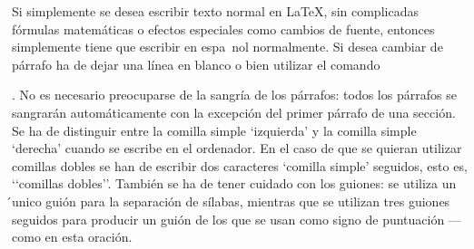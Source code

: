 \documentclass[a4paper,10pt]{letter}
\begin{document}
 Si simplemente se desea escribir texto normal en LaTeX,
 sin complicadas fórmulas matemáticas o efectos especiales
 como cambios de fuente, entonces simplemente tiene que escribir
 en espa~nol normalmente.
 Si desea cambiar de párrafo ha de dejar una línea en blanco o bien
 utilizar el comando \par.
 No es necesario preocuparse de la sangría de los párrafos:
 todos los párrafos se sangrarán automáticamente con la excepción
 del primer párrafo de una sección.
 Se ha de distinguir entre la comilla simple ‘izquierda’
 y la comilla simple ‘derecha’ cuando se escribe en el ordenador.
 En el caso de que se quieran utilizar comillas dobles se han de
 escribir dos caracteres ‘comilla simple’ seguidos, esto es,
 ‘‘comillas dobles’’.
 También se ha de tener cuidado con los guiones: se utiliza un ́unico
 guión para la separación de sílabas, mientras que se utilizan
 tres guiones seguidos para producir un guión de los que se usan
 como signo de puntuación --- como en esta oración.
\end{document}
